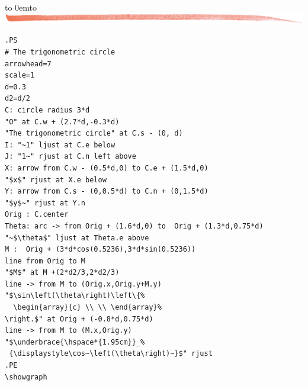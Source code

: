 \documentclass[12pt]{article}
\def\keymenu#1{\textcolor{red}{\underline{#1}}}
\def\advifooter{\vbox to 0em{\vbox to \vsize {\vfill
Press: \keymenu{n}ext page \keymenu{p}revious page
\keymenu{\textvisiblespace} next pause%
} \vss}}
\def\adviheader{\noindent
{\bf\Large \ActiveDVI}\\
\includegraphics[width=\textwidth]{../tex/bar.jpg.eps}}
\let \Newpage \newpage
\def \newpage {\Newpage \advifooter\adviheader}
\def\adviquitfooter{\vbox to 0em{\vbox to \vsize {\vfill
\hfill Press: \keymenu{q} to quit%
} \vss}}
\def\lastpage{\Newpage\adviquitfooter\adviheader}
\begin{document}
\lastpage

\begin{small}
\begin{verbatim}
.PS
# The trigonometric circle
arrowhead=7
scale=1
d=0.3
d2=d/2
C: circle radius 3*d
"O" at C.w + (2.7*d,-0.3*d)
"The trigonometric circle" at C.s - (0, d)
I: "~1" ljust at C.e below
J: "1~" rjust at C.n left above
X: arrow from C.w - (0.5*d,0) to C.e + (1.5*d,0)
"$x$" rjust at X.e below
Y: arrow from C.s - (0,0.5*d) to C.n + (0,1.5*d)
"$y$~" rjust at Y.n
Orig : C.center
Theta: arc -> from Orig + (1.6*d,0) to  Orig + (1.3*d,0.75*d)
"~$\theta$" ljust at Theta.e above
M :  Orig + (3*d*cos(0.5236),3*d*sin(0.5236))
line from Orig to M
"$M$" at M +(2*d2/3,2*d2/3)
line -> from M to (Orig.x,Orig.y+M.y)
"$\sin\left(\theta\right)\left\{%
  \begin{array}{c} \\ \\ \end{array}%
\right.$" at Orig + (-0.8*d,0.75*d)
line -> from M to (M.x,Orig.y)
"$\underbrace{\hspace*{1.95cm}}_%
 {\displaystyle\cos~\left(\theta\right)~}$" rjust
.PE
\showgraph
\end{verbatim}
\end{small}
\end{document}
